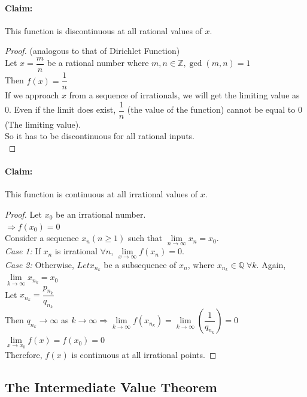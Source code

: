 \documentclass[14]{article}
\theoremstyle{definition}
\theoremstyle{case}
\begin{document}
\paragraph{Claim:} This function is discontinuous at all rational values of $x$.
\begin{proof}(analogous to that of Dirichlet Function)\\
Let $x = \dfrac{m}{n}$ be a rational number where $m, n \in \mathbb{Z}, \gcd(m, n) = 1$\\
Then $f(x) = \dfrac{1}{n}$\\
If we approach $x$ from a sequence of irrationals, we will get the limiting value as $0$. Even if the limit does exist, $\dfrac{1}{n}$ (the value of the function) cannot be equal to $0$ (The limiting value).\\
So it has to be discontinuous for all rational inputs.\\
\end{proof}
\paragraph{Claim:} This function is continuous at all irrational values of $x$.
\begin{proof}
Let $x_0$ be an irrational number.\\
$\Rightarrow f(x_0) = 0$\\
Consider a sequence $x_n (n \geq 1)$ such that $\lim\limits_{n \to \infty} x_n = x_0$.\\
\textit{Case 1:} If $x_n$ is irrational $\forall n$, $\lim\limits_{x \to \infty} f(x_n) = 0$.\\
\textit{Case 2:} Otherwise, $Let x_{n_k}$ be a subsequence of $x_n$, where $x_{n_k} \in \mathbb{Q}\; \forall k$. Again, $\lim\limits_{k \to \infty} x_{n_k} = x_0$\\
Let $x_{n_k} = \dfrac{p_{n_k}}{q_{n_k}}$\\
Then $q_{n_k} \to \infty$ as $k \to \infty \Rightarrow \lim\limits_{k \to \infty}f(x_{n_k}) = \lim\limits_{k \to \infty}\left(\dfrac{1}{q_{n_k}}\right) = 0$\\
$\lim\limits_{x \to x_0} f(x) = f(x_0) = 0$\\
Therefore, $f(x)$ is continuous at all irrational points.
\end{proof}
\pagebreak
\subsection{The Intermediate Value Theorem}
\end{document}
